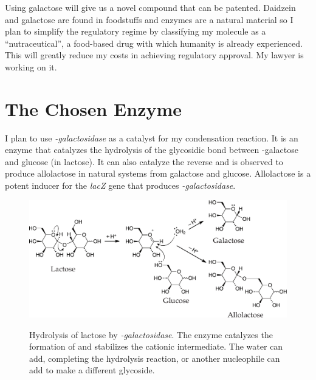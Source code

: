 \documentclass[]{tufte-handout}
\begin{document}
Using galactose will give us a novel compound that can be patented. Daid\-zein and galactose are found in foodstuffs and enzymes are a natural material so I plan to simplify the regulatory regime by classifying my molecule as a ``nutraceutical'', a food-based drug with which humanity is already exper\-i\-enced. This will greatly reduce my costs in achieving regulatory approval. My lawyer is working on it.

\section{The Chosen Enzyme}

I plan to use \emph{\textbeta -galactosidase} as a catalyst for my condensation reaction. It is an enzyme that catalyzes the hydrolysis of the glycosidic bond between \textbeta -galactose and glucose (in lactose). It can also catalyze the reverse and is observed to produce allolactose in natural systems from galactose and glucose. Allolactose is a potent inducer for the \emph{lacZ} gene that produces \emph{\textbeta -galactosidase}.


\begin{figure}[h!]

  \caption[0mm]{Hydrolysis of lactose by \emph{\textbeta -galactosidase}. The enzyme catalyzes the formation of and stabilizes the cationic intermediate. The water can add, completing the hydrolysis reaction, or another nucleophile can add to make a different glycoside.} 
  \vspace{2mm}
    \centering
  \includegraphics[scale=0.6]{enzreaction1.pdf}
  \vspace{5mm}
  \label{fig:fig3}
\end{figure}
\end{document}
